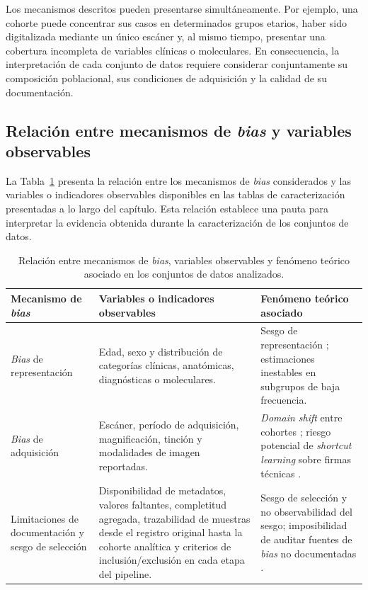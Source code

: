 Los mecanismos descritos pueden presentarse simultáneamente. Por ejemplo, una cohorte puede concentrar sus casos en determinados grupos etarios, haber sido digitalizada mediante un único escáner y, al mismo tiempo, presentar una cobertura incompleta de variables clínicas o moleculares. En consecuencia, la interpretación de cada conjunto de datos requiere considerar conjuntamente su composición poblacional, sus condiciones de adquisición y la calidad de su documentación.

\subsection{Relación entre mecanismos de \textit{bias} y variables observables}

La Tabla~\ref{tab:mecanismos_bias_variables} presenta la relación entre los mecanismos de \textit{bias} considerados y las variables o indicadores observables disponibles en las tablas de caracterización presentadas a lo largo del capítulo. Esta relación establece una pauta para interpretar la evidencia obtenida durante la caracterización de los conjuntos de datos.

\begin{table}[H]
\centering
\caption{Relación entre mecanismos de \textit{bias}, variables observables y fenómeno teórico asociado en los conjuntos de datos analizados.}
\label{tab:mecanismos_bias_variables}
\small
\begin{tabular}{p{2.6cm} p{4.8cm} p{4.8cm}}
\hline
\textbf{Mecanismo de \textit{bias}} &
\textbf{Variables o indicadores observables} &
\textbf{Fenómeno teórico asociado} \\
\hline

\textit{Bias} de representación &
Edad, sexo y distribución de categorías clínicas, anatómicas, diagnósticas o moleculares. &
Sesgo de representación \parencite{suresh2021framework}; estimaciones inestables en subgrupos de baja frecuencia. \\
\hline

\textit{Bias} de adquisición &
Escáner, período de adquisición, magnificación, tinción y modalidades de imagen reportadas. &
\textit{Domain shift} entre cohortes \parencite{stacke2021domainshift}; riesgo potencial de \textit{shortcut learning} sobre firmas técnicas \parencite{geirhos2020shortcut,howard2021site}. \\
\hline

Limitaciones de documentación y sesgo de selección &
Disponibilidad de metadatos, valores faltantes, completitud agregada, trazabilidad de muestras desde el registro original hasta la cohorte analítica y criterios de inclusión/exclusión en cada etapa del pipeline. &
Sesgo de selección y no observabilidad del sesgo; imposibilidad de auditar fuentes de \textit{bias} no documentadas \parencite{suresh2021framework}. \\
\hline
\end{tabular}
\end{table}


